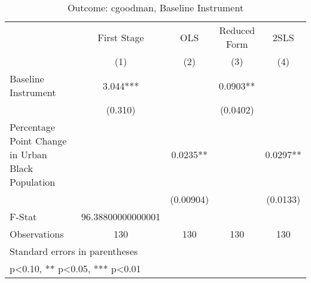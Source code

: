 \begin{table}[htbp]\centering
\def\sym#1{\ifmmode^{#1}\else\(^{#1}\)\fi}
\caption{Outcome: cgoodman, Baseline Instrument}
\begin{tabular}{l*{4}{c}}
\toprule
                    & First Stage   &         OLS   &Reduced Form   &        2SLS   \\
                    &\multicolumn{1}{c}{(1)}   &\multicolumn{1}{c}{(2)}   &\multicolumn{1}{c}{(3)}   &\multicolumn{1}{c}{(4)}   \\
\midrule
Baseline Instrument &       3.044***&               &      0.0903** &               \\
                    &     (0.310)   &               &    (0.0402)   &               \\
\addlinespace
Percentage Point Change in Urban Black Population&               &      0.0235** &               &      0.0297** \\
                    &               &   (0.00904)   &               &    (0.0133)   \\
\midrule
F-Stat              &96.38800000000001   &               &               &               \\
Observations        &         130   &         130   &         130   &         130   \\
\bottomrule
\multicolumn{5}{l}{\footnotesize Standard errors in parentheses}\\
\multicolumn{5}{l}{\footnotesize * p<0.10, ** p<0.05, *** p<0.01}\\
\end{tabular}
\end{table}
